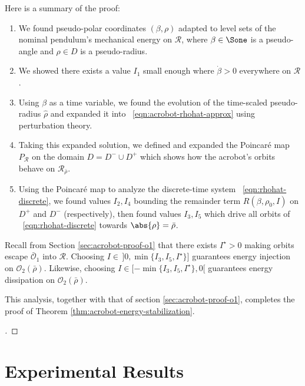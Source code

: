 Here is a summary of the proof:
\begin{enumerate}
    \item We found pseudo-polar coordinates \((\beta,\rho)\) adapted to level
        sets of the nominal pendulum's mechanical energy on \(\mathcal{R}\),
        where \(\beta \in \Sone\) is a pseudo-angle and
        \(\rho \in D\) is a pseudo-radius.
    \item We showed there exists a value \(I_1\) small enough where
        \(\dot{\beta} > 0\) everywhere on \(\mathcal{R}\).
    \item Using \(\beta\) as a time variable, we found the evolution of the
        time-scaled pseudo-radius \(\hat{\rho}\) and expanded it into
        ~\eqref{eqn:acrobot-rhohat-approx} using perturbation theory.
    \item Taking this expanded solution, we defined and expanded the
        Poincar\'{e} map \(P_\mathcal{R}\) on the domain 
        \(D = D^- \cup D^+\) which shows how the acrobot's orbits behave on
        \(\mathcal{R}_{\bar{\rho}}\).
    \item Using the Poincar\'{e} map to analyze the discrete-time system
        ~\eqref{eqn:rhohat-discrete}, we found values \(I_2,I_4\) bounding the
        remainder term \(R(\beta,\rho_0,I)\) on \(D^+\) and \(D^-\)
        (respectively), then found values \(I_3, I_5\) which drive all orbits of
        ~\eqref{eqn:rhohat-discrete} towards \(\abs{\rho} = \bar{\rho}\).
\end{enumerate}
Recall from Section \ref{sec:acrobot-proof-o1} that there exists \(I^\star > 0\)
making orbits escape \(\bar{\mathcal{O}}_1\) into 
\(\mathcal{R}\). 
Choosing \(I \in \,]0,\min\{I_3,I_5,I^\star\}]\)
guarantees energy injection on \(\mathcal{O}_2(\bar{\rho})\).
Likewise, choosing \(I \in [-\min\{I_3,I_5,I^\star\},0[\) guarantees energy
dissipation on \(\mathcal{O}_2(\bar{\rho})\).

This analysis, together with that of section \ref{sec:acrobot-proof-o1},
completes the proof of Theorem \ref{thm:acrobot-energy-stabilization}.

\begin{proof}[\unskip\nopunct]
\end{proof}

\section{Experimental Results}

